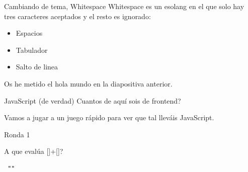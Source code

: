 \documentclass{beamer}
\begin{document}
\begin{frame}{Cambiando de tema, Whitespace}
Whitespace es un esolang en el que solo hay tres caracteres aceptados y el resto es ignorado:
\begin{itemize}
    \item Espacios
    \item Tabulador
    \item Salto de linea
\end{itemize}\pause

Os he metido el hola mundo en la diapositiva anterior.
\end{frame}

\begin{frame}{JavaScript (de verdad)}
Cuantos de aquí sois de frontend? \pause

Vamos a jugar a un juego rápido para ver que tal lleváis JavaScript.
    
\end{frame}

\begin{frame}[fragile]{Ronda 1}

A que evalúa []+[]?\pause

\begin{lstlisting}
 ""
\end{lstlisting}

\end{frame}
\end{document}
